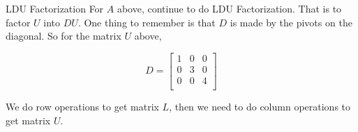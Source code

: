 \documentclass{beamer}
\begin{document}
\begin{frame}{LDU Factorization}
For $A$ above, continue to do LDU Factorization. That is to factor $U$ into $DU$.
One thing to remember is that $D$ is made by the pivots on the diagonal. So for the matrix $U$ above,

\begin{equation*}
    D=\left[ \begin{matrix}
        1&		0&		0\\
        0&		3&		0\\
        0&		0&		4\\
    \end{matrix} \right]
\end{equation*}

We do row operations to get matrix $L$, then we need to do column operations to get matrix $U$.

\end{frame}
\end{document}
